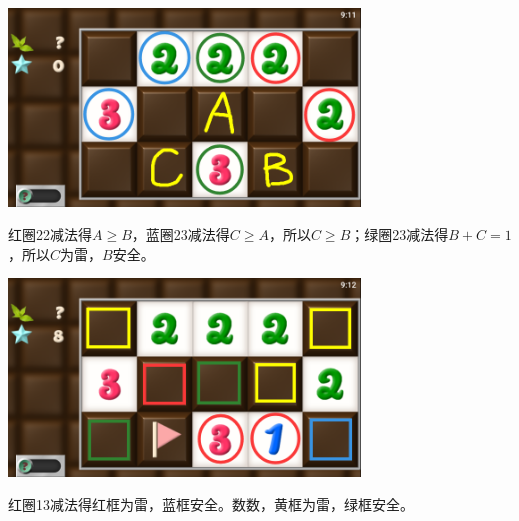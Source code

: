 \subsection{} %
\begin{center}
    \includegraphics[width=0.7\textwidth]{puzzle/117-1.png}
\end{center}
红圈22减法得$A\ge B$，蓝圈23减法得$C\ge A$，所以$C\ge B$；绿圈23减法得$B+C=1$，所以$C$为雷，$B$安全。
\begin{center}
    \includegraphics[width=0.7\textwidth]{puzzle/117-2.png}
\end{center}
红圈13减法得红框为雷，蓝框安全。数数，黄框为雷，绿框安全。

